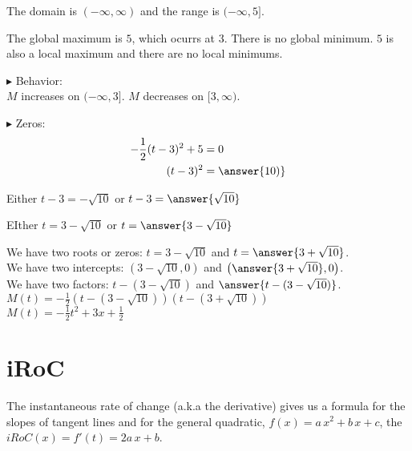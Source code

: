 \documentclass{ximera}
\begin{document}
\begin{example}
The domain is $(-\infty, \infty)$ and the range is $(-\infty, 5]$.

The global maximum is $5$, which ocurrs at $3$.  There is no global minimum.  $5$ is also a local maximum and there are no local minimums.




$\blacktriangleright$ Behavior: \\


$M$ increases on $(-\infty, 3]$. $M$ decreases on $[3, \infty)$.



$\blacktriangleright$ Zeros: \\





\begin{align*}
-\frac{1}{2} (t-3)^2 + 5 & = 0  \\
(t-3)^2     &= \answer{10)} 
\end{align*}

Either $t - 3 = -\sqrt{10}$ or $t - 3 = \answer{\sqrt{10}}$

EIther $t = 3 - \sqrt{10}$ or $t = \answer{3 - \sqrt{10}}$






We have two roots or zeros: $t = 3 - \sqrt{10}$ and $t = \answer{3 + \sqrt{10}}$. \\


We have two intercepts: $(3 - \sqrt{10}, 0)$ and $\left( \answer{3 + \sqrt{10}}, 0 \right)$. \\


We have two factors: $t - (3 - \sqrt{10})$ and $\answer{t - (3 - \sqrt{10})}$. \\


$M(t) = -\frac{1}{2} (t - (3 - \sqrt{10})) (t - (3 + \sqrt{10}))$ \\

$M(t) =  -\frac{1}{2} t^2 + 3x + \frac{1}{2}$


\end{example}



\section{iRoC}


The instantaneous rate of change (a.k.a the derivative) gives us a formula for the slopes of tangent lines and for the general quadratic, $f(x) = a \, x^2 + b \, x + c$, the $iRoC(x) = f'(t) = 2a \, x + b$. \\
\end{document}
